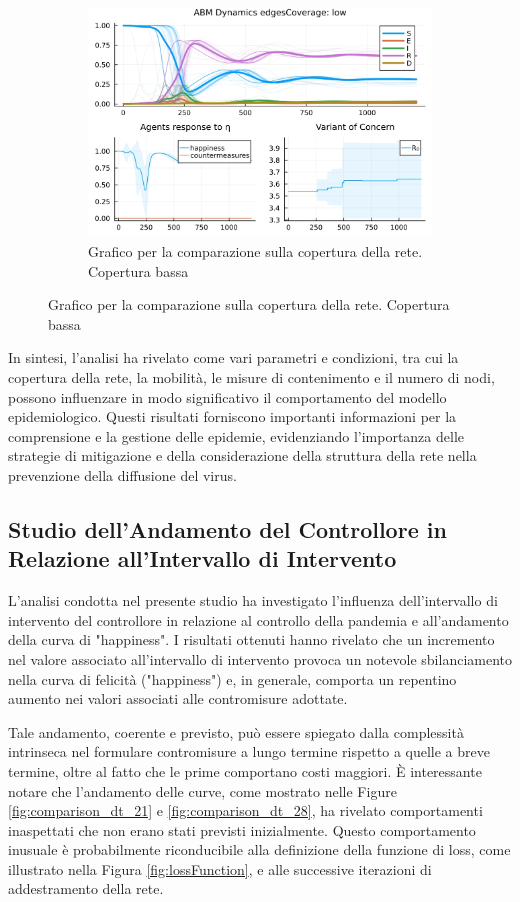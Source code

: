 \begin{figure}[!hb]
\begin{subfigure}[b]{0.3\textwidth}
		\includegraphics[width=\textwidth]{img/SocialNetworkABM_3_EC.jpg}
		\caption{Grafico per la comparazione sulla copertura della rete. Copertura bassa}
		\label{fig:comparison_lowCoverage}
	\end{subfigure}
\end{figure}

In sintesi, l'analisi ha rivelato come vari parametri e condizioni, 
tra cui la copertura della rete, la mobilità, le misure di contenimento 
e il numero di nodi, possono influenzare in modo significativo il 
comportamento del modello epidemiologico. Questi risultati forniscono 
importanti informazioni per la comprensione e la gestione delle epidemie, 
evidenziando l'importanza delle strategie di mitigazione e della 
considerazione della struttura della rete nella prevenzione della 
diffusione del virus.

\subsection{Studio dell'Andamento del Controllore in Relazione all'Intervallo di Intervento}
L'analisi condotta nel presente studio ha investigato l'influenza 
dell'intervallo di intervento del controllore in relazione al controllo 
della pandemia e all'andamento della curva di "happiness". I risultati 
ottenuti hanno rivelato che un incremento nel valore associato 
all'intervallo di intervento provoca un notevole sbilanciamento nella 
curva di felicità ("happiness") e, in generale, comporta un repentino 
aumento nei valori associati alle contromisure adottate.

Tale andamento, coerente e previsto, può essere spiegato dalla 
complessità intrinseca nel formulare contromisure a lungo termine 
rispetto a quelle a breve termine, oltre al fatto che le prime 
comportano costi maggiori. È interessante notare che l'andamento delle 
curve, come mostrato nelle Figure \ref{fig:comparison_dt_21} e 
\ref{fig:comparison_dt_28}, ha rivelato comportamenti inaspettati che 
non erano stati previsti inizialmente. Questo comportamento inusuale è 
probabilmente riconducibile alla definizione della funzione di loss, 
come illustrato nella Figura \ref{fig:lossFunction}, e alle successive 
iterazioni di addestramento della rete.

